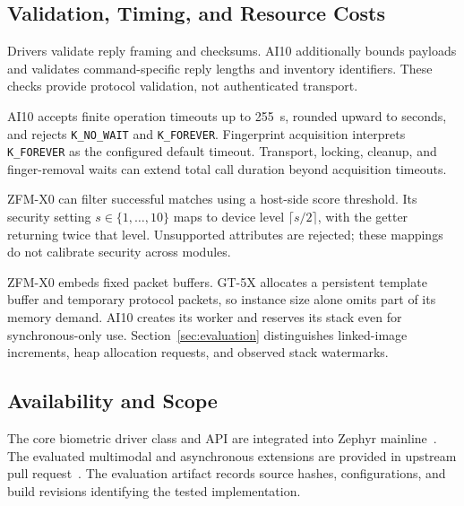 \subsection{Validation, Timing, and Resource Costs}

Drivers validate reply framing and checksums. AI10 additionally bounds payloads and validates command-specific reply lengths and inventory identifiers. These checks provide protocol validation, not authenticated transport.

AI10 accepts finite operation timeouts up to 255~s, rounded upward to seconds, and rejects \texttt{K\_NO\_WAIT} and \texttt{K\_FOREVER}. Fingerprint acquisition interprets \texttt{K\_FOREVER} as the configured default timeout. Transport, locking, cleanup, and finger-removal waits can extend total call duration beyond acquisition timeouts.

ZFM-X0 can filter successful matches using a host-side score threshold. Its security setting $s\in\{1,\ldots,10\}$ maps to device level $\lceil s/2\rceil$, with the getter returning twice that level. Unsupported attributes are rejected; these mappings do not calibrate security across modules.

ZFM-X0 embeds fixed packet buffers. GT-5X allocates a persistent template buffer and temporary protocol packets, so instance size alone omits part of its memory demand. AI10 creates its worker and reserves its stack even for synchronous-only use. Section~\ref{sec:evaluation} distinguishes linked-image increments, heap allocation requests, and observed stack watermarks.

\subsection{Availability and Scope}
\label{sec:availability}

The core biometric driver class and API are integrated into Zephyr mainline~\cite{zephyr_biometrics}. The evaluated multimodal and asynchronous extensions are provided in upstream pull request~\cite{zephyr_pr2}. The evaluation artifact records source hashes, configurations, and build revisions identifying the tested implementation.
